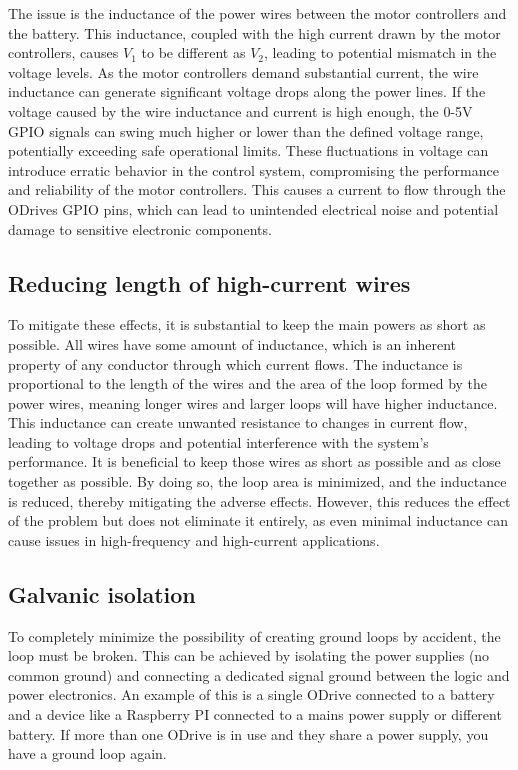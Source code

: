 The issue is the inductance of the power wires between the motor controllers and the battery. This inductance, coupled with the high current drawn by the motor controllers, causes $V_1$ to be different as $V_2$, leading to potential mismatch in the voltage levels. As the motor controllers demand substantial current, the wire inductance can generate significant voltage drops along the power lines. If the voltage caused by the wire inductance and current is high enough, the 0-5V GPIO signals can swing much higher or lower than the defined voltage range, potentially exceeding safe operational limits. These fluctuations in voltage can introduce erratic behavior in the control system, compromising the performance and reliability of the motor controllers. This causes a current to flow through the ODrives GPIO pins, which can lead to unintended electrical noise and potential damage to sensitive electronic components.

\subsection{Reducing length of high-current wires}

To mitigate these effects, it is substantial to keep the main powers as short as possible. All wires have some amount of inductance, which is an inherent property of any conductor through which current flows. The inductance is proportional to the length of the wires and the area of the loop formed by the power wires, meaning longer wires and larger loops will have higher inductance. This inductance can create unwanted resistance to changes in current flow, leading to voltage drops and potential interference with the system's performance. It is beneficial to keep those wires as short as possible and as close together as possible. By doing so, the loop area is minimized, and the inductance is reduced, thereby mitigating the adverse effects. However, this reduces the effect of the problem but does not eliminate it entirely, as even minimal inductance can cause issues in high-frequency and high-current applications.

\subsection{Galvanic isolation}

To completely minimize the possibility of creating ground loops by accident, the loop must be broken. This can be achieved by isolating the power supplies (no common ground) and connecting a dedicated signal ground between the logic and power electronics. An example of this is a single ODrive connected to a battery and a device like a Raspberry PI connected to a mains power supply or different battery. If more than one ODrive is in use and they share a power supply, you have a ground loop again.

